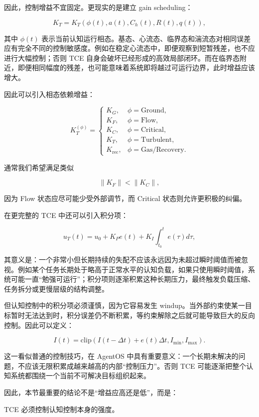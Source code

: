 因此，控制增益不宜固定。更现实的是建立 gain scheduling：

\[
K_T
=
K_T
\left(
\phi(t),
a(t),
C_h(t),
R(t),
q(t)
\right),
\]

其中 $\phi(t)$ 表示当前认知运行相态。基态、心流态、临界态和湍流态对相同误差应有完全不同的控制敏感度。例如在稳定心流态中，即便观察到短暂残差，也不应进行大幅控制；否则 TCE 自身会破坏已经形成的高效局部闭环。而在临界态附近，即便相同幅度的残差，也可能意味着系统即将越过可运行边界，此时增益应该增大。

因此可以引入相态依赖增益：

\[
K_T^{(\phi)}
=
\begin{cases}
K_G, & \phi=\mathrm{Ground},\\
K_F, & \phi=\mathrm{Flow},\\
K_C, & \phi=\mathrm{Critical},\\
K_T, & \phi=\mathrm{Turbulent},\\
K_{\mathrm{rec}}, & \phi=\mathrm{Gas/Recovery}.
\end{cases}
\]

通常我们希望满足类似

\[
\|K_F\|
<
\|K_C\|,
\]

因为 Flow 状态应尽可能少受外部调节，而 Critical 状态则允许更积极的纠偏。

在更完整的 TCE 中还可以引入积分项：

\[
u_T(t)
=
u_0+
K_Pe(t)
+
K_I\int_{t_0}^{t}e(\tau)d\tau,
\]

其意义是：一个非常小但长期持续的失配不应该永远因为未超过瞬时阈值而被忽视。例如某个任务长期处于略高于正常水平的认知负载，如果只使用瞬时阈值，系统可能一直“勉强可运行”；积分项则逐渐积累这种长期压力，最终触发负载压缩、任务拆分或更慢层级的结构调整。

但认知控制中的积分项必须谨慎，因为它容易发生 windup。当外部约束使某一目标暂时无法达到时，积分误差仍不断积累，等约束解除之后就可能导致巨大的反向控制。因此可以定义：

\[
I(t)
=
\mathrm{clip}
\left(
I(t-\Delta t)+e(t)\Delta t,
I_{\min},
I_{\max}
\right).
\]

这一看似普通的控制技巧，在 AgentOS 中具有重要意义：一个长期未解决的问题，不应该无限积累成越来越高的内部“控制压力”。否则 TCE 可能逐渐把整个认知系统都围绕一个当前不可解决目标组织起来。

因此，本节最重要的结论不是“增益应高还是低”，而是：

\begin{conclusion}
TCE 必须控制认知控制本身的强度。
\end{conclusion}

